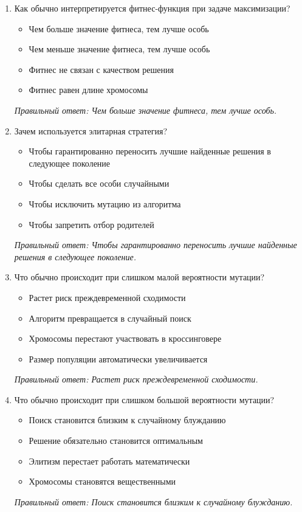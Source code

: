 \begin{enumerate}[label=\textbf{\arabic*.}, leftmargin=0pt, itemsep=1.2em]
\item Как обычно интерпретируется фитнес-функция при задаче максимизации?
\begin{itemize}[label=$\square$, leftmargin=1.5cm, itemsep=0.2em, topsep=0.3em]
\item Чем больше значение фитнеса, тем лучше особь
\item Чем меньше значение фитнеса, тем лучше особь
\item Фитнес не связан с качеством решения
\item Фитнес равен длине хромосомы
\end{itemize}
{\small\textit{Правильный ответ: Чем больше значение фитнеса, тем лучше особь.}}

\item Зачем используется элитарная стратегия?
\begin{itemize}[label=$\square$, leftmargin=1.5cm, itemsep=0.2em, topsep=0.3em]
\item Чтобы гарантированно переносить лучшие найденные решения в следующее поколение
\item Чтобы сделать все особи случайными
\item Чтобы исключить мутацию из алгоритма
\item Чтобы запретить отбор родителей
\end{itemize}
{\small\textit{Правильный ответ: Чтобы гарантированно переносить лучшие найденные решения в следующее поколение.}}

\item Что обычно происходит при слишком малой вероятности мутации?
\begin{itemize}[label=$\square$, leftmargin=1.5cm, itemsep=0.2em, topsep=0.3em]
\item Растет риск преждевременной сходимости
\item Алгоритм превращается в случайный поиск
\item Хромосомы перестают участвовать в кроссинговере
\item Размер популяции автоматически увеличивается
\end{itemize}
{\small\textit{Правильный ответ: Растет риск преждевременной сходимости.}}

\item Что обычно происходит при слишком большой вероятности мутации?
\begin{itemize}[label=$\square$, leftmargin=1.5cm, itemsep=0.2em, topsep=0.3em]
\item Поиск становится близким к случайному блужданию
\item Решение обязательно становится оптимальным
\item Элитизм перестает работать математически
\item Хромосомы становятся вещественными
\end{itemize}
{\small\textit{Правильный ответ: Поиск становится близким к случайному блужданию.}}


\end{enumerate}
